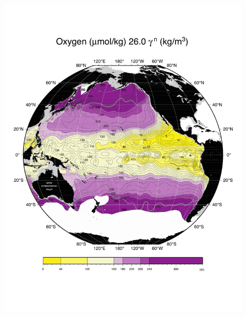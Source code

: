 \documentclass{beamer}
\begin{document}
\begin{frame}[plain,t]
\begin{columns}
\begin{column}{0.33\textwidth}
          \includegraphics[width=\textwidth]{oxygen_isopyc_final_pdf/pac2600_oxygen_final.pdf}  
      \end{column}
      \begin{column}{0.33\textwidth}

\end{column}
\end{columns}
\end{frame}
\end{document}
